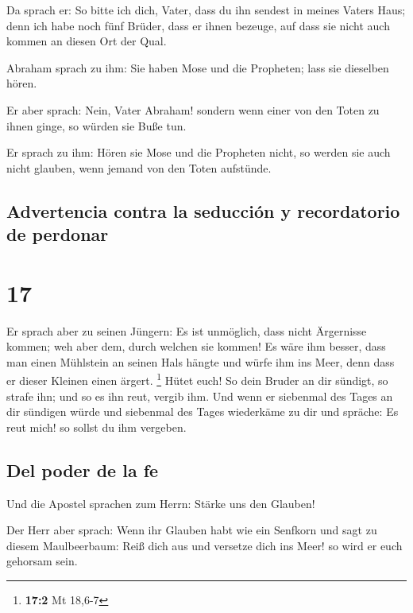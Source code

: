  Da sprach er: So bitte ich dich, Vater, dass du ihn
sendest in meines Vaters Haus;  denn ich habe noch fünf
Brüder, dass er ihnen bezeuge, auf dass sie nicht auch kommen an diesen
Ort der Qual.

 Abraham sprach zu ihm: Sie haben Mose und die Propheten;
lass sie dieselben hören.

 Er aber sprach: Nein, Vater Abraham! sondern wenn einer
von den Toten zu ihnen ginge, so würden sie Buße tun.

 Er sprach zu ihm: Hören sie Mose und die Propheten
nicht, so werden sie auch nicht glauben, wenn jemand von den Toten
aufstünde.

\hypertarget{advertencia-contra-la-seducciuxf3n-y-recordatorio-de-perdonar}{%
\subsection{Advertencia contra la seducción y recordatorio de
perdonar}\label{advertencia-contra-la-seducciuxf3n-y-recordatorio-de-perdonar}}

\hypertarget{section-16}{%
\section{17}\label{section-16}}

 Er sprach aber zu seinen Jüngern: Es ist unmöglich, dass
nicht Ärgernisse kommen; weh aber dem, durch welchen sie kommen!
 Es wäre ihm besser, dass man einen Mühlstein an seinen
Hals hängte und würfe ihm ins Meer, denn dass er dieser Kleinen einen
ärgert. \footnote{\textbf{17:2} Mt 18,6-7}  Hütet euch! So
dein Bruder an dir sündigt, so strafe ihn; und so es ihn reut, vergib
ihm.  Und wenn er siebenmal des Tages an dir sündigen
würde und siebenmal des Tages wiederkäme zu dir und spräche: Es reut
mich! so sollst du ihm vergeben.

\hypertarget{del-poder-de-la-fe}{%
\subsection{Del poder de la fe}\label{del-poder-de-la-fe}}

 Und die Apostel sprachen zum Herrn: Stärke uns den
Glauben!

 Der Herr aber sprach: Wenn ihr Glauben habt wie ein
Senfkorn und sagt zu diesem Maulbeerbaum: Reiß dich aus und versetze
dich ins Meer! so wird er euch gehorsam sein.

